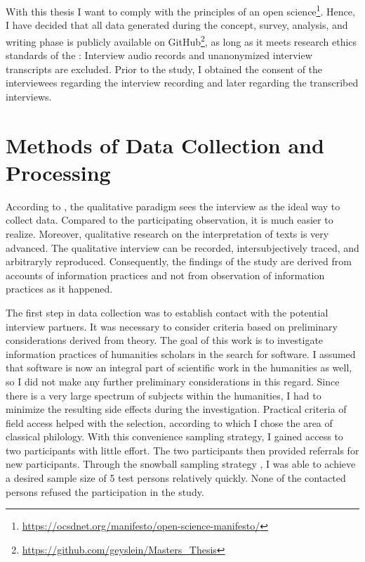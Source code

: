 \documentclass[12pt,a4paper,titlepage,oneside,abstract=true,toc=listof,toc=bibliography]{scrreprt}
\begin{document}
With this thesis I want to comply with the principles of an open science\footnote{\url{https://ocsdnet.org/manifesto/open-science-manifesto/}}. Hence, I have decided that all data generated during the concept, survey, analysis, and writing phase is publicly available on GitHub\footnote{\url{https://github.com/geyslein/Masters_Thesis}}, as long as it meets research ethics standards of the \citet{DeutscheForschungsgemeinschaft2019}: Interview audio records and unanonymized interview transcripts are excluded. Prior to the study, I obtained the consent of the interviewees regarding the interview recording and later regarding the transcribed interviews.

\section{Methods of Data Collection and Processing}
According to \citet[p. 329]{Lamnek2005}, the qualitative paradigm sees the interview as the ideal way to collect data. Compared to the participating observation, it is much easier to realize. Moreover, qualitative research on the interpretation of texts is very advanced. The qualitative interview can be recorded, intersubjectively traced, and arbitraryly reproduced. Consequently, the findings of the study are derived from accounts of information practices and not from observation of information practices as it happened. 

The first step in data collection was to establish contact with the potential interview partners. It was necessary to consider criteria based on preliminary considerations derived from theory. The goal of this work is to investigate information practices of humanities scholars in the search for software. I assumed that software is now an integral part of scientific work in the humanities as well, so I did not make any further preliminary considerations in this regard. Since there is a very large spectrum of subjects within the humanities, I had to minimize the resulting side effects during the investigation. Practical criteria of field access helped with the selection, according to which I chose the area of classical philology. With this convenience sampling strategy, I gained access to two participants with little effort. The two participants then provided referrals for new participants. Through the snowball sampling strategy \citep{Biernacki1981}, I was able to achieve a desired sample size of 5 test persons relatively quickly. None of the contacted persons refused the participation in the study.
\end{document}
